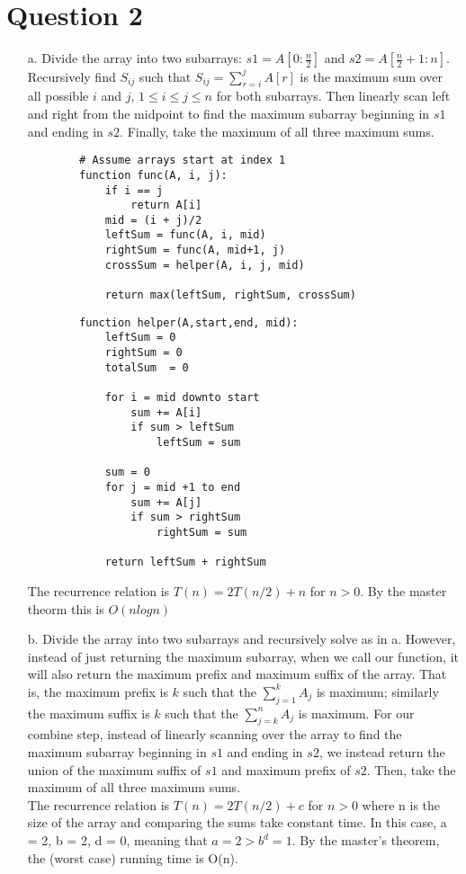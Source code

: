 \documentclass[12pt]{article}
\begin{document}
\section*{Question 2}
\begin{enumerate}
    \item[a.] Divide the array into two subarrays: $s1 = A[0:\frac{n}{2}]$ and $s2 = A[\frac{n}{2} + 1:n]$. Recursively find $S_{ij}$ such that $S_{ij} = \sum_{r=i}^j A[r]$ is the maximum sum over all possible $i$ and $j$, $1 \leq i \leq j \leq n$ for both subarrays. Then linearly scan left and right from the midpoint to find the maximum subarray beginning in $s1$ and ending in $s2$. Finally, take the maximum of all three maximum sums. 
    \begin{verbatim}
        # Assume arrays start at index 1
        function func(A, i, j):
            if i == j
                return A[i]
            mid = (i + j)/2
            leftSum = func(A, i, mid)
            rightSum = func(A, mid+1, j)
            crossSum = helper(A, i, j, mid)
        
            return max(leftSum, rightSum, crossSum)
    \end{verbatim}
    
    \begin{verbatim}
        function helper(A,start,end, mid):
            leftSum = 0
            rightSum = 0
            totalSum  = 0
        
            for i = mid downto start
                sum += A[i]
                if sum > leftSum
                    leftSum = sum
            
            sum = 0
            for j = mid +1 to end
                sum += A[j]
                if sum > rightSum
                    rightSum = sum
            
            return leftSum + rightSum
    \end{verbatim}
    
    The recurrence relation is $T(n) = 2T(n/2) + n$ for $n>0$. By the master theorm this is $O(nlogn)$
    \newpage
    \item[b.] Divide the array into two subarrays and recursively solve as in a. However, instead of just returning the maximum subarray, when we call our function, it will also return the maximum prefix and maximum suffix of the array. That is, the maximum prefix is $k$ such that the $\sum_{j=1}^k A_j$ is maximum; similarly the maximum suffix is $k$ such that the $\sum_{j=k}^n A_j$ is maximum. For our combine step, instead of linearly scanning over the array to find the maximum subarray beginning in $s1$ and ending in $s2$, we instead return the union of the maximum 
    suffix of $s1$ and maximum prefix of $s2$. Then, take the maximum of all three maximum sums.\\
    The recurrence relation is $T(n) = 2T(n/2) + c$ for $n>0$ where n is the size of the array and comparing the sums take constant time. In this case, a = 2, b = 2, d = 0, meaning that $a = 2 > b^d = 1$. By the master's theorem, the (worst case) running time is O(n).
    

\end{enumerate}
\end{document}
